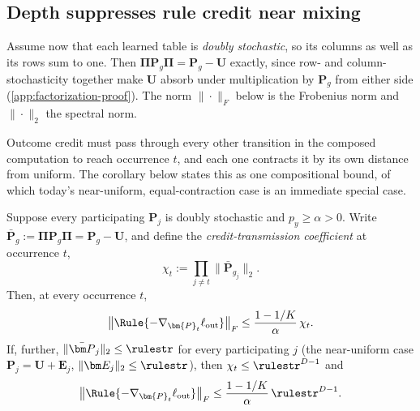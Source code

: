 \subsection{Depth suppresses rule credit near mixing}

Assume now that each learned table is \emph{doubly stochastic}, so its columns
as well as its rows sum to one. Then $\bm\Pi\bm P_g\bm\Pi=\bm P_g-\bm U$
exactly, since row- and column-stochasticity together make $\bm U$ absorb
under multiplication by $\bm P_g$ from either side
(\cref{app:factorization-proof}). The norm $\|\cdot\|_F$ below is the
Frobenius norm and $\|\cdot\|_2$ the spectral norm.

Outcome credit must pass through every other transition in the composed
computation to reach occurrence $t$, and each one contracts it by its own
distance from uniform. The corollary below states this as one
compositional bound, of which today's near-uniform, equal-contraction
case is an immediate special case.

\begin{corollary}
\label{cor:near-mixing}
Suppose every participating $\bm{P}_j$ is doubly stochastic and $p_y\ge\alpha>0$.
Write $\bar{\bm P}_g:=\bm\Pi\bm P_g\bm\Pi=\bm P_g-\bm U$, and define the
\emph{credit-transmission coefficient} at occurrence $t$,
\begin{equation}
 \chi_t:=\prod_{j\ne t}\|\bar{\bm P}_{g_j}\|_2.
 \label{eq:credit-transmissivity}
\end{equation}
Then, at every occurrence $t$,
\begin{equation}
 \left\|\Rule{-\nabla_{\bm{P}_t}\ell_{\rm out}}\right\|_F
 \le\frac{1-1/K}{\alpha}\,\chi_t.
 \label{eq:general-credit-bound}
\end{equation}
If, further, $\|\bar{\bm P}_j\|_2\le\rulestr$ for every participating $j$
(the near-uniform case $\bm{P}_j=\bm{U}+\bm{E}_j$, $\|\bm E_j\|_2\le\rulestr$),
then $\chi_t\le\rulestr^{D-1}$ and
\begin{equation}
 \left\|\Rule{-\nabla_{\bm{P}_t}\ell_{\rm out}}\right\|_F
 \le\frac{1-1/K}{\alpha}\,\rulestr^{D-1}.
 \label{eq:depth-credit-bound}
\end{equation}
\end{corollary}

